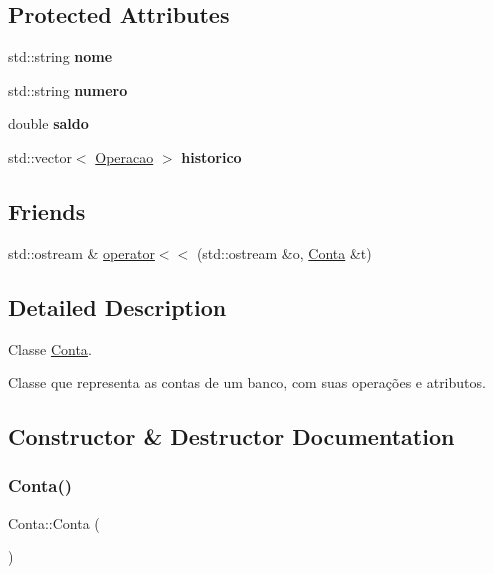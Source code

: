 \subsection*{Protected Attributes}
\begin{DoxyCompactItemize}
\item 
\mbox{\label{classConta_a69b0f3d489f92a4ccf8f310a0a4746a0}} 
std\+::string {\bfseries nome}
\item 
\mbox{\label{classConta_a5d1f9b17ce74680ed3678e8eb219f006}} 
std\+::string {\bfseries numero}
\item 
\mbox{\label{classConta_a1a1918d76ff00086dc6c5bcffbd8eef0}} 
double {\bfseries saldo}
\item 
\mbox{\label{classConta_aef5f0fc20b8aade058a2fb6864ee027f}} 
std\+::vector$<$ \hyperlink{classOperacao}{Operacao} $>$ {\bfseries historico}
\end{DoxyCompactItemize}
\subsection*{Friends}
\begin{DoxyCompactItemize}
\item 
std\+::ostream \& \hyperlink{classConta_a0a72b144512bab26faac4766f3305d59}{operator$<$$<$} (std\+::ostream \&o, \hyperlink{classConta}{Conta} \&t)
\end{DoxyCompactItemize}


\subsection{Detailed Description}
Classe \hyperlink{classConta}{Conta}. 

Classe que representa as contas de um banco, com suas operações e atributos. 

\subsection{Constructor \& Destructor Documentation}
\mbox{\label{classConta_ab22bc5e18f43b383aca57201ee68cb1e}} 
\subsubsection{\texorpdfstring{Conta()}{Conta()}\hspace{0.1cm}{\footnotesize\ttfamily [1/2]}}
{\footnotesize\ttfamily Conta\+::\+Conta (\begin{DoxyParamCaption}{ }\end{DoxyParamCaption})}

